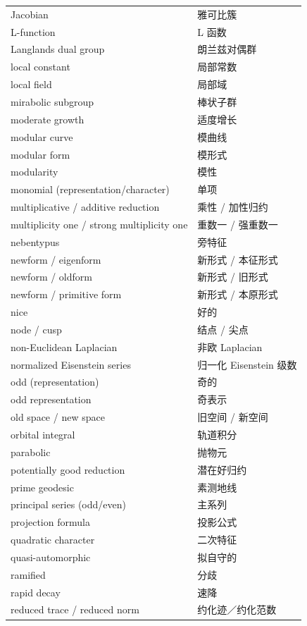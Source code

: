 {\begin{longtable}{@{}p{}p{}@{}}
Jacobian & 雅可比簇 \\
L-function & L 函数 \\
Langlands dual group & 朗兰兹对偶群 \\
local constant & 局部常数 \\
local field & 局部域 \\
mirabolic subgroup & 棒状子群 \\
moderate growth & 适度增长 \\
modular curve & 模曲线 \\
modular form & 模形式 \\
modularity & 模性 \\
monomial (representation/character) & 单项 \\
multiplicative / additive reduction & 乘性 / 加性归约 \\
multiplicity one / strong multiplicity one & 重数一 / 强重数一 \\
nebentypus & 旁特征 \\
newform / eigenform & 新形式 / 本征形式 \\
newform / oldform & 新形式 / 旧形式 \\
newform / primitive form & 新形式 / 本原形式 \\
nice & 好的 \\
node / cusp & 结点 / 尖点 \\
non-Euclidean Laplacian & 非欧 Laplacian \\
normalized Eisenstein series & 归一化 Eisenstein 级数 \\
odd (representation) & 奇的 \\
odd representation & 奇表示 \\
old space / new space & 旧空间 / 新空间 \\
orbital integral & 轨道积分 \\
parabolic & 抛物元 \\
potentially good reduction & 潜在好归约 \\
prime geodesic & 素测地线 \\
principal series (odd/even) & 主系列 \\
projection formula & 投影公式 \\
quadratic character & 二次特征 \\
quasi-automorphic & 拟自守的 \\
ramified & 分歧 \\
rapid decay & 速降 \\
reduced trace / reduced norm & 约化迹／约化范数 \\

\end{longtable}}
